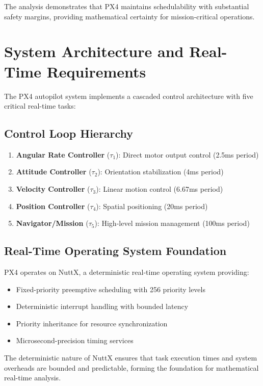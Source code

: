 \documentclass[11pt]{article}
\begin{document}
The analysis demonstrates that PX4 maintains schedulability with substantial safety margins, providing mathematical certainty for mission-critical operations.

\section{System Architecture and Real-Time Requirements}

The PX4 autopilot system implements a cascaded control architecture with five critical real-time tasks:

\subsection{Control Loop Hierarchy}

\begin{enumerate}
    \item \textbf{Angular Rate Controller} ($\tau_1$): Direct motor output control (2.5ms period)
    \item \textbf{Attitude Controller} ($\tau_2$): Orientation stabilization (4ms period)
    \item \textbf{Velocity Controller} ($\tau_3$): Linear motion control (6.67ms period)
    \item \textbf{Position Controller} ($\tau_4$): Spatial positioning (20ms period)
    \item \textbf{Navigator/Mission} ($\tau_5$): High-level mission management (100ms period)
\end{enumerate}

\subsection{Real-Time Operating System Foundation}

PX4 operates on NuttX, a deterministic real-time operating system providing:
\begin{itemize}
    \item Fixed-priority preemptive scheduling with 256 priority levels
    \item Deterministic interrupt handling with bounded latency
    \item Priority inheritance for resource synchronization
    \item Microsecond-precision timing services
\end{itemize}

The deterministic nature of NuttX ensures that task execution times and system overheads are bounded and predictable, forming the foundation for mathematical real-time analysis.
\end{document}

